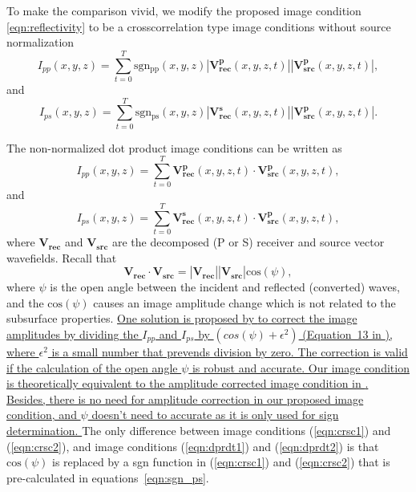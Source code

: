 \documentclass[manuscript,ulem,graphix,revised]{geophysics}
\begin{document}
To make the comparison vivid, we modify the proposed image condition \ref{eqn:reflectivity} to be a crosscorrelation type image conditions without source normalization
\begin{equation}
I_{pp}(x,y,z)=\sum_{t=0}^{T}\mathrm{sgn_{pp}}(x,y,z)|\mathbf{V^p_{rec}}(x,y,z,t)||\mathbf{V^p_{src}}(x,y,z,t)|,
\label{eqn:crsc1}
\end{equation}
and
\begin{equation}
I_{ps}(x,y,z)=\sum_{t=0}^{T}\mathrm{sgn_{ps}}(x,y,z)|\mathbf{V^s_{rec}}(x,y,z,t)||\mathbf{V^p_{src}}(x,y,z,t)|.
\label{eqn:crsc2}
\end{equation}

The non-normalized dot product image conditions can be written as
\begin{equation}
I_{pp}(x,y,z)=\sum_{t=0}^{T}\mathbf{V^p_{rec}}(x,y,z,t)\cdot \mathbf{V^p_{src}}(x,y,z,t),
\label{eqn:dprdt1}
\end{equation}
and
\begin{equation}
I_{ps}(x,y,z)=\sum_{t=0}^{T}\mathbf{V^s_{rec}}(x,y,z,t)\cdot \mathbf{V^p_{src}}(x,y,z,t),
\label{eqn:dprdt2}
\end{equation}
where $\mathbf{V_{rec}}$ and $\mathbf{V_{src}}$ are the decomposed (P or S) receiver and source vector wavefields. Recall that 
\begin{equation}
\mathbf{V_{rec}}\cdot \mathbf{V_{src}}=|\mathbf{V_{rec}}||\mathbf{V_{src}}|\mathrm{cos}(\psi),
\label{eqn:a3}
\end{equation}
where $\psi$ is the open angle between the incident and reflected (converted) waves, and the $\mathrm{cos}(\psi)$ causes an image amplitude change which is not related to the subsurface properties. 
\marginnote{[2]}\uline{One solution is proposed by \mbox{\citet{du17}} to correct the image amplitudes by dividing the $I_{pp}$ and $I_{ps}$ by $(cos(\psi) + \epsilon^2)$ (Equation~13 in \mbox{\citet{du17}}), where $\epsilon^2$ is a small number that prevends division by zero. The correction is valid if the calculation of the open angle $\psi$ is robust and accurate. 
Our image condition is theoretically equivalent to the amplitude corrected image condition in \mbox{\citet{du17}}. Besides, there is no need for amplitude correction in our proposed image condition, and $\psi$ doesn't need to accurate as it is only used for sign determination. }
The only difference between image conditions (\ref{eqn:crsc1}) and (\ref{eqn:crsc2}), and image conditions (\ref{eqn:dprdt1}) and (\ref{eqn:dprdt2}) is that $\mathrm{cos}(\psi)$ is replaced by a sgn function in (\ref{eqn:crsc1}) and (\ref{eqn:crsc2}) that is pre-calculated in equations~\ref{eqn:sgn_ps}.


\newpage


\end{document}
